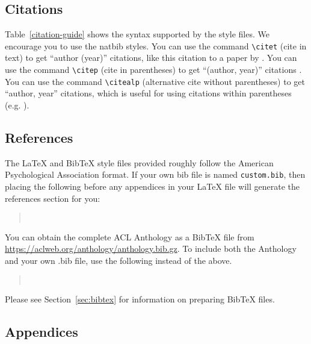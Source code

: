 \documentclass[11pt]{article}
\begin{document}
\subsection{Citations}



Table~\ref{citation-guide} shows the syntax supported by the style files.
We encourage you to use the natbib styles.
You can use the command \verb|\citet| (cite in text) to get ``author (year)'' citations, like this citation to a paper by \citet{Gusfield:97}.
You can use the command \verb|\citep| (cite in parentheses) to get ``(author, year)'' citations \citep{Gusfield:97}.
You can use the command \verb|\citealp| (alternative cite without parentheses) to get ``author, year'' citations, which is useful for using citations within parentheses (e.g. \citealp{Gusfield:97}).

\subsection{References}

\nocite{Ando2005,augenstein-etal-2016-stance,andrew2007scalable,rasooli-tetrault-2015,goodman-etal-2016-noise,harper-2014-learning}

The \LaTeX{} and Bib\TeX{} style files provided roughly follow the American Psychological Association format.
If your own bib file is named \texttt{custom.bib}, then placing the following before any appendices in your \LaTeX{} file will generate the references section for you:
\begin{quote}
\begin{verbatim}


\end{verbatim}
\end{quote}
You can obtain the complete ACL Anthology as a Bib\TeX{} file from \url{https://aclweb.org/anthology/anthology.bib.gz}.
To include both the Anthology and your own .bib file, use the following instead of the above.
\begin{quote}
\begin{verbatim}


\end{verbatim}
\end{quote}
Please see Section~\ref{sec:bibtex} for information on preparing Bib\TeX{} files.

\subsection{Appendices}
\end{document}
